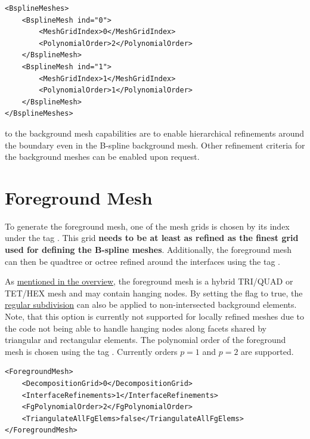 \begin{minipage}{\linewidth}
\vspace{0.5cm}
\begin{lstlisting}[caption={Definition of a multiple mesh grids},captionpos=b, label={lst:bsp_meshes}]
<BsplineMeshes>
    <BsplineMesh ind="0">
        <MeshGridIndex>0</MeshGridIndex>
        <PolynomialOrder>2</PolynomialOrder>
    </BsplineMesh>
    <BsplineMesh ind="1">
        <MeshGridIndex>1</MeshGridIndex>
        <PolynomialOrder>1</PolynomialOrder>
    </BsplineMesh>
</BsplineMeshes>
\end{lstlisting}
\end{minipage}

 to the background mesh capabilities are to enable hierarchical refinements around the boundary even in the B-spline background mesh. Other refinement criteria for the background meshes can be enabled upon request.

\section{Foreground Mesh}
\label{sec:tutorial_foreground}

To generate the foreground mesh, one of the mesh grids is chosen by its index under the tag . This grid \textbf{needs to be at least as refined as the finest grid used for defining the B-spline meshes}. Additionally, the foreground mesh can then be quadtree or octree refined around the interfaces using the tag .

As \hyperlink{foreground_mesh_properties}{mentioned in the overview}, the foreground mesh is a hybrid TRI/QUAD or TET/HEX mesh and may contain hanging nodes. By setting the flag  to true, the \hyperlink{regular_subdivision}{regular subdivision} can also be applied to non-intersected background elements. Note, that this option is currently not supported for locally refined meshes due to the code not being able to handle hanging nodes along facets shared by triangular and rectangular elements. The polynomial order of the foreground mesh is chosen using the tag . Currently orders $p=1$ and $p=2$ are supported.

\begin{minipage}{\linewidth}
\vspace{0.5cm}
\begin{lstlisting}[caption={Definition of a multiple mesh grids},captionpos=b, label={lst:fg_mesh}]
<ForegroundMesh>
    <DecompositionGrid>0</DecompositionGrid>
    <InterfaceRefinements>1</InterfaceRefinements>
    <FgPolynomialOrder>2</FgPolynomialOrder>
    <TriangulateAllFgElems>false</TriangulateAllFgElems>
</ForegroundMesh>
\end{lstlisting}
\end{minipage}

